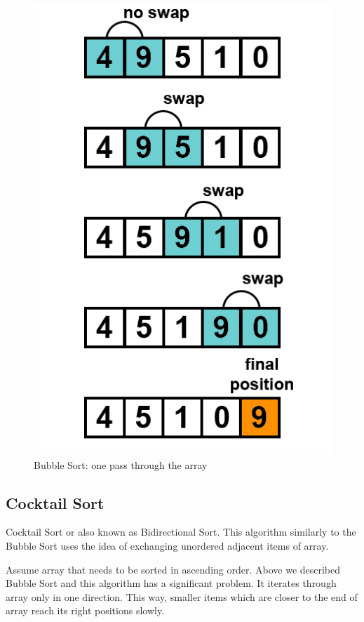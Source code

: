 \documentclass[
  field=inf,
  biblatex,
  language=english,
  glossaries,
  theorems=false,
  sourcecodes=false,
  index
]{kidiplom}
\begin{document}
\begin{figure}[H]
\begin{center}
	
	\includegraphics[scale=0.39]{img/Bubblesort.png}
	\caption{Bubble Sort: one pass through the array}\label{fig:bubble}
\end{center}
\end{figure}

\subsection{Cocktail Sort}
\label{sec:cocktailsort}

Cocktail Sort or also known as Bidirectional Sort. This algorithm similarly to the Bubble Sort uses the idea of exchanging unordered adjacent items of array. 

Assume array that needs to be sorted in ascending order. Above we described Bubble Sort and this algorithm has a significant problem. It iterates through array only in one direction. This way, smaller items which are closer to the end of array reach its right positions slowly.
\end{document}
